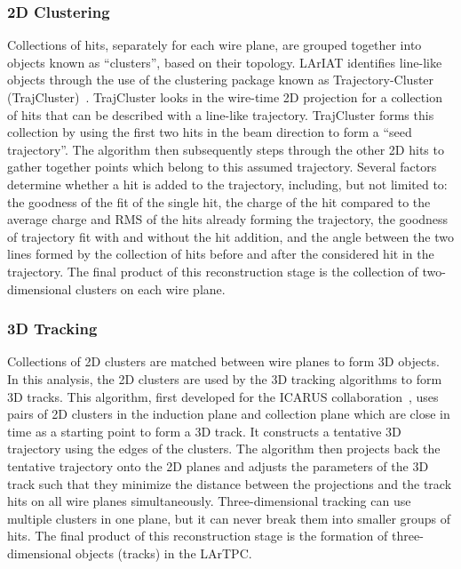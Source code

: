 \documentclass[%
 floatfix,
 reprint,
 twocolumn,
superscriptaddress,
showpacs,preprintnumbers,
 amsmath,amssymb,
 aps,
prd,
]{revtex4-1}
\begin{document}
\subsubsection{2D Clustering}\label{sec:Cluster}
Collections of hits, separately for each wire plane, are grouped together into objects known as ``clusters'', based on their topology. LArIAT identifies line-like objects %
through the use of the clustering package known as Trajectory-Cluster (TrajCluster)~\cite{Baller:2017ugz}. TrajCluster looks in the wire-time 2D projection for a collection of hits that can be described with a line-like trajectory. TrajCluster forms this collection by using the first two hits in the beam direction to form a ``seed trajectory''. The algorithm then subsequently steps through the other 2D hits to gather together points which belong to this assumed trajectory. Several factors determine whether a hit is added to the trajectory, including, but not limited to: the goodness of the fit of the single hit, the charge of the hit compared to the average charge and RMS of the hits already forming the trajectory, the goodness of trajectory fit with and without the hit addition, and the angle between the two lines formed by the collection of hits before and after the considered hit in the trajectory. The final product of this reconstruction stage is the collection of two-dimensional clusters on each wire plane. 

\subsubsection{3D Tracking}\label{sec:Tracking}
Collections of 2D clusters are matched between wire planes to form 3D objects. In this analysis, the 2D  clusters are used by the 3D tracking algorithms to form 3D tracks. This algorithm, first developed for the ICARUS collaboration~\cite{Antonello2013}, uses pairs of 2D clusters in the induction plane and collection plane which are close in time as a starting point to form a 3D track. It constructs a tentative 3D trajectory using the edges of the clusters. The algorithm then projects back the tentative trajectory onto the 2D planes and adjusts the parameters of the 3D track such that they minimize the distance between the projections and the track hits on all wire planes simultaneously.  Three-dimensional tracking can use multiple clusters in one plane, but it can never break them into smaller groups of hits. The final product of this reconstruction stage is the formation of three-dimensional objects (tracks) in the LArTPC. \\
\end{document}
